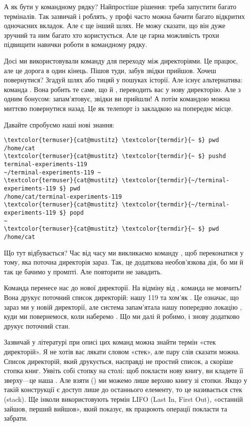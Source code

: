 А як бути у командному рядку?
Найпростіше рішення: треба запустити багато терміналів.
Так зазвичай і роблять,
у профі часто можна бачити багато відкритих одночасних вкладок.
Але є ще інший шлях.
Не можу сказати, що він дуже зручний та ним багато хто користується.
Але це гарна можливість трохи підвищити навички роботи в командному рядку.

Досі ми використовували команду  для переходу між директоріями.
Це працює, але  це дорога в один кінець.
Пішов туди, забув звідки прийшов.
Хочеш повернутися? Згадуй шлях або тицяй  у пошуках історії.
Але існує альтернатива: команда .
Вона робить те саме, що й , переводить вас у нову директорію.
Але з одним бонусом: запам'ятовує, звідки ви прийшли!
А потім командою  можна миттєво повернутися назад.
Це як телепорт із закладкою на попереднє місце.

Давайте спробуємо наші нові знання:

\begin{Verbatim}[fontsize=\footnotesize,commandchars=\\\{\},xleftmargin=\parindent]
\textcolor{termuser}{cat@mustitz} \textcolor{termdir}{~ $} pwd
/home/cat
\textcolor{termuser}{cat@mustitz} \textcolor{termdir}{~ $} pushd terminal-experiments-119
~/terminal-experiments-119 ~
\textcolor{termuser}{cat@mustitz} \textcolor{termdir}{~/terminal-experiments-119 $} pwd
/home/cat/terminal-experiments-119
\textcolor{termuser}{cat@mustitz} \textcolor{termdir}{~/terminal-experiments-119 $} popd
~
\textcolor{termuser}{cat@mustitz} \textcolor{termdir}{~ $} pwd
/home/cat
\end{Verbatim}

Що тут відбувається?
Час від часу ми викликаємо команду ,
щоб переконатися у тому, яка поточна директорія зараз.
Так, це додаткова необов'язкова дія, бо ми й так це бачимо у промпті.
Але повторити не завадить.

Команда  перенесе нас до нової директорії.
На відміну від , команда  не мовчить!
Вона друкує поточний список директорій: нашу 119 та хом'як \term{\textasciitilde}.
Це означає, що зараз ми у новій директорії,
але система запам'ятала нашу попередню локацію \file{\textasciitilde},
куди ми повернемося, коли наберемо .
Що ми далі й робимо, і  знову додатково друкує поточний стан.

Зазвичай у літературі при описі цих команд можна знайти термін «стек директорій».
Я не хотів вас лякати словом «стек», але пару слів сказати можна.
Список директорій, який друкується, насправді не простий список, а скоріше стопка книг.
Уявіть собі стопку на столі: щоб покласти нову книгу, ви кладете її зверху---це наша .
Але взяти () ми можемо лише верхню книгу зі стопки.
Якщо у такій конструкції є доступ лише до останнього елементу, то це називається стек (stack).
Ще інколи використовують термін LIFO (Last In, First Out), «останній зайшов, перший вийшов»,
який показує, як працюють операції покласти та забрати.

